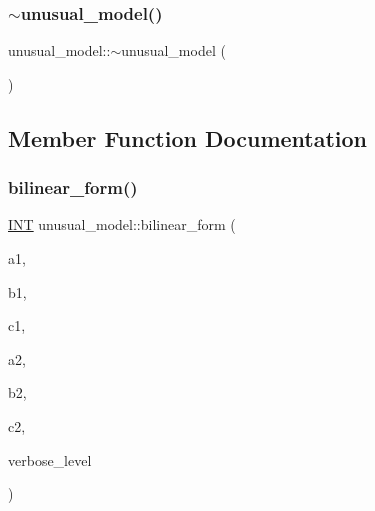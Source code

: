 \subsubsection{\texorpdfstring{$\sim$unusual\+\_\+model()}{~unusual\_model()}}
{\footnotesize\ttfamily unusual\+\_\+model\+::$\sim$unusual\+\_\+model (\begin{DoxyParamCaption}{ }\end{DoxyParamCaption})}



\subsection{Member Function Documentation}
\mbox{\label{classunusual__model_a85eb45f85b0277a8da6743792f0ef053}} 
\subsubsection{\texorpdfstring{bilinear\+\_\+form()}{bilinear\_form()}}
{\footnotesize\ttfamily \mbox{\hyperlink{galois_8h_a09fddde158a3a20bd2dcadb609de11dc}{I\+NT}} unusual\+\_\+model\+::bilinear\+\_\+form (\begin{DoxyParamCaption}\item[{\mbox{\hyperlink{galois_8h_a09fddde158a3a20bd2dcadb609de11dc}{I\+NT}}}]{a1,  }\item[{\mbox{\hyperlink{galois_8h_a09fddde158a3a20bd2dcadb609de11dc}{I\+NT}}}]{b1,  }\item[{\mbox{\hyperlink{galois_8h_a09fddde158a3a20bd2dcadb609de11dc}{I\+NT}}}]{c1,  }\item[{\mbox{\hyperlink{galois_8h_a09fddde158a3a20bd2dcadb609de11dc}{I\+NT}}}]{a2,  }\item[{\mbox{\hyperlink{galois_8h_a09fddde158a3a20bd2dcadb609de11dc}{I\+NT}}}]{b2,  }\item[{\mbox{\hyperlink{galois_8h_a09fddde158a3a20bd2dcadb609de11dc}{I\+NT}}}]{c2,  }\item[{\mbox{\hyperlink{galois_8h_a09fddde158a3a20bd2dcadb609de11dc}{I\+NT}}}]{verbose\+\_\+level }\end{DoxyParamCaption})}

\mbox{\label{classunusual__model_a76f6f9c1cbd32b66d03fdc9785f7aea8}} 
